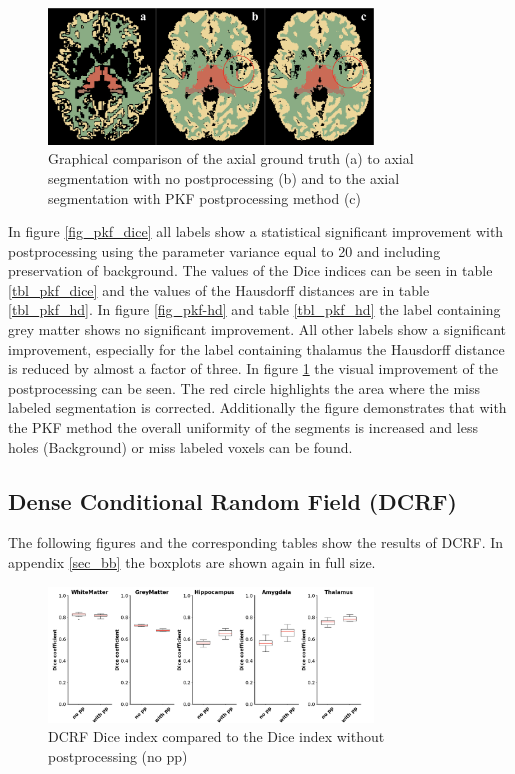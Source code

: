 \documentclass[journal]{IEEEtran}
\begin{document}
\begin{figure}[h!]
\centering
\includegraphics[width=3.4in]{img/boxplots/PKF.png}
\caption{Graphical comparison of the axial ground truth (a) to axial segmentation with no postprocessing (b) and to the axial segmentation with PKF postprocessing method (c) }
\label{fig_pkf}
\end{figure}

In figure \ref{fig_pkf_dice} all labels show a statistical significant improvement with postprocessing using the parameter variance equal to 20 and including preservation of background. The values of the Dice indices can be seen in table \ref{tbl_pkf_dice} and the values of the Hausdorff distances are in table \ref{tbl_pkf_hd}.
In figure \ref{fig_pkf-hd} and table \ref{tbl_pkf_hd} the label containing grey matter shows no significant improvement. All other labels show a significant improvement, especially for the label containing thalamus the Hausdorff distance is reduced by almost a factor of three.
In figure \ref{fig_pkf} the visual improvement of the postprocessing can be seen. The red circle highlights the area where the miss labeled segmentation is corrected. Additionally the figure demonstrates that with the PKF method the overall uniformity of the segments is increased and less holes (Background) or miss labeled voxels can be found.

\subsection{Dense Conditional Random Field (DCRF)}
The following figures and the corresponding tables show the results of DCRF. In appendix \ref{sec_bb} the boxplots are shown again in full size.
\begin{figure}[ht]
\centering
\includegraphics[width=3.4in]{img/boxplots/DCRF-DICE.png}
\caption{DCRF Dice index compared to the Dice index without postprocessing (no pp)}
\label{fig_dcrf_dice}
\end{figure}
\end{document}
